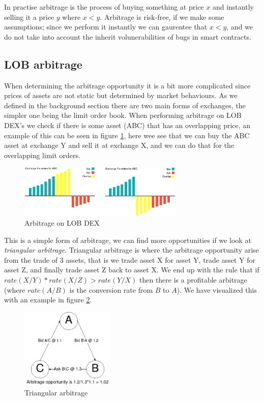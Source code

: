 In practise arbitrage is the process of buying something at price $x$
and instantly selling it a price $y$ where $x<y$. Arbitrage is
risk-free, if we make some assumptions; since we perform it instantly
we can gaurentee that $x<y$, and we do not take into account the
inherit volunerabilities of bugs in smart contracts.

\subsection{LOB arbitrage}

When determining the arbitrage opportunity it is a bit more
complicated since prices of assets are not static but determined by
market behaviours. As we defined in the background section there are
two main forms of exchanges, the simpler one being the limit order
book. When performing arbitrage on LOB DEX's we check if there is some
asset (ABC) that has an overlapping price, an example of this can be
seen in figure \ref{fig:ArbLOB}, here wee see that we can buy the ABC
asset at exchange Y and sell it at exchange X, and we can do that for
the overlapping limit orders.
\begin{figure}[h]
\centering
\includegraphics[width=0.7\textwidth]{assests/Flash-loans-Arbitrage-Overlap-1}
\caption{Arbitrage on LOB DEX}
\label{fig:ArbLOB}
\end{figure}
This is a simple form of arbitrage, we can find more opportunities if
we look at \textit{triangular arbitrage}. Triangular arbitrage is
where the arbitrage opportunity arise from the trade of 3 assets, that
is we trade asset X for asset Y, trade asset Y for asset Z, and
finally trade asset Z back to asset X. We end up with the rule that if
$rate(X/Y)*rate(X/Z)>rate(Y/X)$ then there is a profitable arbitrage
(where $rate(A/B)$ is the conversion rate from $B$ to $A$). We have
visualized this with an example in figure \ref{fig:ArbTrig}.
\begin{figure}[h]
\centering
\includegraphics[width=0.4\textwidth]{assests/Flash-loans-Arbitrage-triangular}
\caption{Triangular arbitrage}
\label{fig:ArbTrig}
\end{figure}

